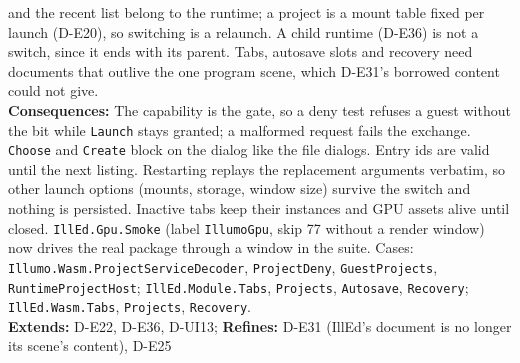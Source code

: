 \begin{decisionbox}[title={D-E42 \quad 2026-10-22}]
and the recent list belong to the runtime; a project is a mount table fixed
per launch (D-E20), so switching is a relaunch. A child runtime (D-E36) is not
a switch, since it ends with its parent. Tabs, autosave slots and recovery need
documents that outlive the one program scene, which D-E31's borrowed content
could not give.\\
\textbf{Consequences:} The capability is the gate, so a deny test refuses a
guest without the bit while \texttt{Launch} stays granted; a malformed
request fails the exchange. \texttt{Choose} and \texttt{Create} block on the
dialog like the file dialogs. Entry ids are valid until the next listing.
Restarting replays the replacement arguments verbatim, so other launch
options (mounts, storage, window size) survive the switch and nothing is
persisted. Inactive tabs keep their instances and GPU assets alive until
closed. \texttt{IllEd.Gpu.Smoke} (label \texttt{IllumoGpu}, skip 77 without a
render window) now drives the real package through a window in the suite.
Cases: \texttt{Illumo.Wasm.ProjectServiceDecoder}, \texttt{ProjectDeny},
\texttt{GuestProjects}, \texttt{RuntimeProjectHost}; \texttt{IllEd.Module.Tabs},
\texttt{Projects}, \texttt{Autosave}, \texttt{Recovery}; \texttt{IllEd.Wasm.Tabs},
\texttt{Projects}, \texttt{Recovery}.\\
\textbf{Extends:} D-E22, D-E36, D-UI13; \textbf{Refines:} D-E31 (IllEd's
document is no longer its scene's content), D-E25
\end{decisionbox}

